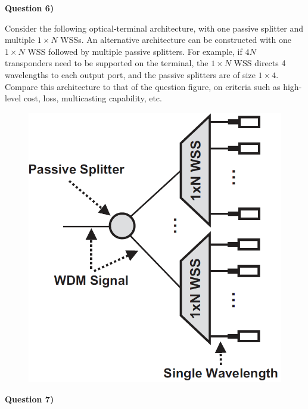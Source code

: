 \documentclass[10pt,letterpaper]{article}
\newcommand{\Q}[1]{\textbf{Question #1)}}
\begin{document}
\Q6

Consider the following optical-terminal architecture, with one passive splitter and multiple $1\times N$ WSSs. An alternative architecture can be constructed with one $1\times N$ WSS followed by multiple passive splitters. For example, if $4N$ transponders need to be supported on the terminal, the $1\times N$ WSS directs 4 wavelengths to each output port, and the passive splitters are of size $1\times 4$. Compare this architecture to that of the question figure, on criteria such as high-level cost, loss, multicasting capability, etc.
\begin{figure}[ht]
\centering
\includegraphics[scale=0.3]{PS1_OET}
\end{figure}

\Q7
\end{document}
